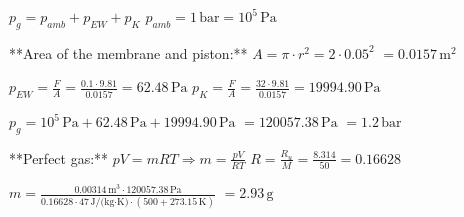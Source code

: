 \( p_g = p_{amb} + p_{EW} + p_{K} \)  
\( p_{amb} = 1 \, \text{bar} = 10^5 \, \text{Pa} \)  

**Area of the membrane and piston:**  
\( A = \pi \cdot r^2 = 2 \cdot 0.05^2 \)  
\( = 0.0157 \, \text{m}^2 \)  

\( p_{EW} = \frac{F}{A} = \frac{0.1 \cdot 9.81}{0.0157} = 62.48 \, \text{Pa} \)  
\( p_{K} = \frac{F}{A} = \frac{32 \cdot 9.81}{0.0157} = 19994.90 \, \text{Pa} \)  

\( p_g = 10^5 \, \text{Pa} + 62.48 \, \text{Pa} + 19994.90 \, \text{Pa} \)  
\( = 120057.38 \, \text{Pa} \)  
\( = 1.2 \, \text{bar} \)  

**Perfect gas:**  
\( pV = mRT \Rightarrow m = \frac{pV}{RT} \)  
\( R = \frac{R_u}{M} = \frac{8.314}{50} = 0.16628 \)  

\( m = \frac{0.00314 \, \text{m}^3 \cdot 120057.38 \, \text{Pa}}{0.16628 \cdot 47 \, \text{J/(kg·K)} \cdot (500 + 273.15 \, \text{K})} \)  
\( = 2.93 \, \text{g} \)